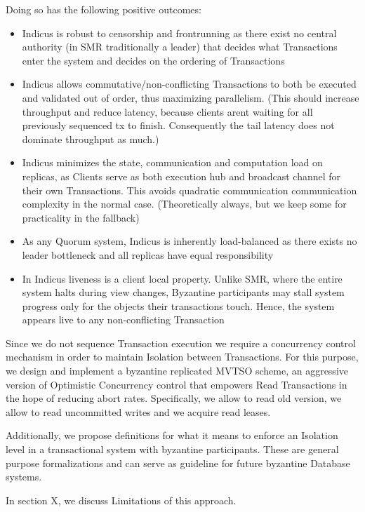 Doing so has the following positive outcomes:
\begin{itemize}

\item Indicus is robust to censorship and frontrunning as there exist no central authority (in SMR traditionally a leader) that decides what Transactions enter the system and decides on the ordering of Transactions
\item Indicus allows commutative/non-conflicting Transactions to both be executed and validated out of order, thus maximizing parallelism. (This should increase throughput and reduce latency, because clients arent waiting for all previously sequenced tx to finish. Consequently the tail latency does not dominate throughput as much.)
\item Indicus minimizes the state, communication and computation load on replicas, as Clients serve as both execution hub and broadcast channel for their own Transactions. This avoids quadratic communication communication complexity in the normal case. (Theoretically always, but we keep some for practicality in the fallback)
\item As any Quorum system, Indicus is inherently load-balanced as there exists no leader bottleneck and all replicas have equal responsibility
\item In Indicus liveness is a client local property. Unlike SMR, where the entire system halts during view changes, Byzantine participants may stall system progress only for the objects their transactions touch. Hence, the system appears live to any non-conflicting Transaction
\end{itemize}

Since we do not sequence Transaction execution we require a concurrency control mechanism in order to maintain Isolation between Transactions.
For this purpose, we design and implement a byzantine replicated MVTSO scheme, an aggressive version of Optimistic Concurrency control that empowers Read Transactions in the hope of reducing abort rates. Specifically, we allow to read old version, we allow to read uncommitted writes and we acquire read leases.

Additionally, we propose definitions for what it means to enforce an Isolation level in a transactional system with byzantine participants. These are general purpose formalizations and can serve as guideline for future byzantine Database systems.

In section X, we discuss Limitations of this approach. 


